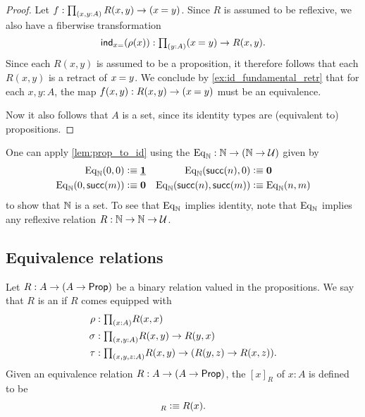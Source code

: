 \begin{proof}
Let $f:\prd{x,y:A}R(x,y)\to(\id{x}{y})$. 
Since $R$ is assumed to be reflexive, we also have a fiberwise transformation
\begin{equation*}
\ind{x{=}}(\rho(x)):\prd{y:A}(\id{x}{y})\to R(x,y).
\end{equation*}
Since each $R(x,y)$ is assumed to be a proposition, it therefore follows that each $R(x,y)$ is a retract of $\id{x}{y}$. We conclude by \autoref{ex:id_fundamental_retr} that for each $x,y:A$, the map $f(x,y):R(x,y)\to(\id{x}{y})$ must be an equivalence.

Now it also follows that $A$ is a set, since its identity types are (equivalent to) propositions.
\end{proof}

\begin{eg}
One can apply \cref{lem:prop_to_id} using the  $\mathrm{Eq}_\mathbb{N}:\mathbb{N}\to (\mathbb{N}\to\mathcal{U})$ given by
\begin{align*}
\mathrm{Eq}_\mathbb{N}(0,0) & \vcentcolon\equiv \underline{\mathbf{1}} & \mathrm{Eq}_\mathbb{N}(\mathsf{succ}(n),0) & \vcentcolon\equiv \mathbf{0} \\
\mathrm{Eq}_\mathbb{N}(0,\mathsf{succ}(m)) & \vcentcolon\equiv \mathbf{0} & \mathrm{Eq}_\mathbb{N}(\mathsf{succ}(n),\mathsf{succ}(m)) & \vcentcolon\equiv \mathrm{Eq}_\mathbb{N}(n,m)
\end{align*}
to show that $\mathbb{N}$ is a set. To see that $\mathrm{Eq}_\mathbb{N}$ implies identity, note that $\mathrm{Eq}_\mathbb{N}$ implies any reflexive relation $R:\mathbb{N}\to\mathbb{N}\to\mathcal{U}$.
\end{eg}

\subsection{Equivalence relations}

\begin{defn}\label{defn:eq_rel}
Let $R:A\to (A\to\mathsf{Prop})$ be a binary relation valued in the propositions. We say that $R$ is an  if $R$ comes equipped with
\begin{align*}
\rho & : \prd{x:A}R(x,x) \\
\sigma & : \prd{x,y:A} R(x,y)\to R(y,x) \\
\tau & : \prd{x,y,z:A} R(x,y)\to (R(y,z)\to R(x,z)).
\end{align*}
Given an equivalence relation $R:A\to (A\to\mathsf{Prop})$, the  $[x]_R$ of $x:A$ is defined to be
\begin{equation*}
[x]_R\defeq R(x).
\end{equation*}
\end{defn}


